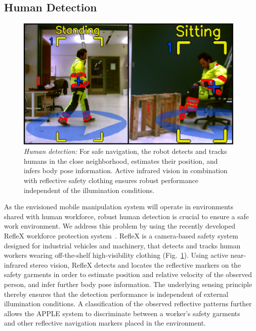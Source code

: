 \subsection{Human Detection}
\label{subsec:people_det}
%
\begin{figure}[t!]
  \begin{center}
    \includegraphics[width =0.99\linewidth]{figs/person_detection}
    \caption{\textit{Human detection:} For safe navigation, the robot detects and tracks humans in
      the close neighborhood, estimates their position, and infers body pose information. Active
      infrared vision in combination with reflective safety clothing ensures robust performance
      independent of the illumination conditions.}
    \label{fig:people_det}
    \vspace{-0.55cm}
  \end{center}
\end{figure}
% 
As the envisioned mobile manipulation system will operate in environments shared with human
workforce, robust human detection is crucial to ensure a safe work environment. We address this
problem by using the recently developed RefleX workforce protection system~\cite{Mosb14}. RefleX is
a camera-based safety system designed for industrial vehicles and machinery, that detects and tracks
human workers wearing off-the-shelf high-visibility clothing (Fig.~\ref{fig:people_det}). Using
active near-infrared stereo vision, RefleX detects and locates the reflective markers on the safety
garments in order to estimate position and relative velocity of the observed person, and infer
further body pose information. The underlying sensing principle thereby ensures that the detection
performance is independent of external illumination conditions. A classification of the observed
reflective patterns further allows the APPLE system to discriminate between a worker's safety
garments and other reflective navigation markers placed in the environment.
